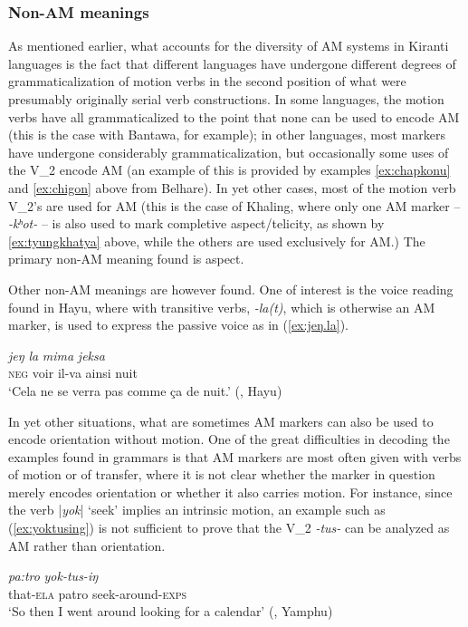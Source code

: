 \documentclass[oneside,a4paper,11pt]{article}
\newcommand{\ipa}[1]{{\phon\textit{#1}}}
\newcommand{\sens}[1]{‘#1’}
\newcommand{\dhatu}[2]{|\ipa{#1}| `#2'}
\begin{document}
 \subsubsection{Non-AM meanings} \label{sec:khaling.non.am}
As mentioned earlier, what accounts for the diversity of AM systems in Kiranti languages is the fact that different languages have undergone different degrees of grammaticalization of motion verbs in the second position of what were presumably originally serial verb constructions.  In some languages, the motion verbs have all grammaticalized to the point that none can be used to encode AM (this is the case with Bantawa, for example); in other languages, most markers have undergone considerably grammaticalization, but occasionally some uses of the V_2 encode AM (an example of this is provided by examples  \ref{ex:chapkonu} and \ref{ex:chigon} above from Belhare).  In yet other cases, most of the motion verb V_2's are used for AM (this is the case of Khaling, where only one AM marker -- \ipa{-kʰot-} -- is also used to mark completive aspect/telicity, as shown by \ref{ex:tyungkhatya} above, while the others are used exclusively for AM.)  
The primary non-AM meaning found is aspect.

Other non-AM meanings are however found.  One of interest is the voice reading found in Hayu, where with transitive verbs, \ipa{-la(t)}, which is otherwise an AM marker, is used to express the passive voice as in (\ref{ex:jeŋ.la}).

\begin{exe}
\ex \label{ex:jeŋ.la}
 \gll \ipa{ma}	\ipa{jeŋ}	\ipa{la}	\ipa{mima}	\ipa{jeksa} \\
\textsc{neg} voir il-va ainsi nuit \\
\glt \sens{Cela ne se verra pas comme ça de nuit.} (\citealt[153]{michailovsky88}, Hayu)
\end{exe}

In yet other situations, what are sometimes AM markers can also be used to encode orientation without motion.  One of the great difficulties in decoding the examples found in grammars is that AM markers are most often given with verbs of motion or of transfer, where it is not clear whether the marker in question merely encodes orientation or whether it also carries motion. For instance, since the verb \dhatu{yok}{seek} implies an intrinsic motion, an example such as (\ref{ex:yoktusing}) is not sufficient to prove that the V_2 \ipa{-tus-} can be analyzed as AM rather than orientation.
 
\begin{exe}
\ex \label{ex:yoktusing}
 \gll  \ipa{mo-ba}	\ipa{pa:tro}	\ipa{yok-tus-iŋ} \\
that-\textsc{ela} patro seek-around-\textsc{exps} \\
\glt \sens{So then I went around looking for a calendar} (\citealt[153]{rutgers98yamphu}, Yamphu)
\end{exe}
\end{document}
